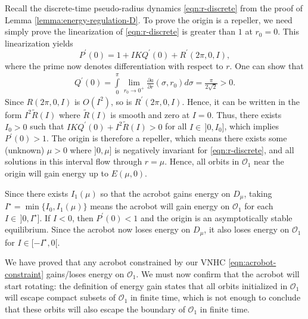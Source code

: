 \documentclass[journal,twoside,web, twocolumn,draftcls]{ieeecolor}
\newcommand*{\pdiff}[2]{\frac{\partial #1}{\partial #2}}
\begin{document}
Recall the discrete-time pseudo-radius dynamics \eqref{eqn:r-discrete} from the
proof of Lemma \ref{lemma:energy-regulation-D}. 
To prove the origin is a repeller, we need simply
prove the linearization of \eqref{eqn:r-discrete} is greater than \(1\) at 
\(r_0 = 0\). 
This linearization yields
\[
    P^\prime(0) = 1 + I K Q^\prime(0) + R^\prime(2\pi,0,I)
    ,
\]
where the prime now denotes differentiation with respect to \(r\).
One can show that
\begin{align*}
    Q^\prime(0) = \int \limits_0^\pi 
    \lim \limits_{r_0 \to 0^+}\pdiff{a}{r}(\sigma,r_0) d\sigma
    = \frac{\pi}{2\sqrt{2}} > 0
    .
\end{align*}
Since \(R(2\pi,0,I)\) is \(O(I^2)\), so is
\(R^\prime(2\pi,0,I)\).
Hence, it can be written in the form
\(I^2 \tilde{R}(I)\) where \(\tilde{R}(I)\) is smooth and zero at \(I = 0\).
Thus, there exists \(I_0 > 0\) such that 
\(I K Q^\prime(0) + I^2 \tilde{R}(I) > 0\) for all \(I \in \, ]0,I_0]\),
which implies \(P^\prime(0) > 1\).
The origin is therefore a repeller, which means there exists some
(unknown) \(\mu > 0\) where \(]0,\mu]\) is negatively
invariant for \eqref{eqn:r-discrete}, and all solutions in this
interval flow through \(r = \mu\).
Hence, all orbits in \(\mathcal{O}_1\) near the
origin will gain energy up to \(E(\mu,0)\).

Since there exists \(I_1(\mu)\) so that the acrobot gains energy on \(D_\mu\),
taking \(I^\star = \min\{I_0,I_1(\mu)\}\) means the acrobot will gain energy on
\(\mathcal{O}_1\) for each \(I \in \, ]0,I^\star]\).
If \(I < 0\), then \(P^\prime(0) < 1\) and the origin is an
asymptotically stable equilibrium.
Since the acrobot now loses energy on \(D_\mu\), it also loses energy 
on \(\mathcal{O}_1\) for \(I \in [-I^\star,0[\).

We have proved that any acrobot constrained by 
our VNHC \eqref{eqn:acrobot-constraint} gains/loses energy on \(\mathcal{O}_1\).
We must now confirm that the acrobot will start rotating:
the definition of energy gain states that all orbits initialized in
\(\mathcal{O}_1\) will escape compact subsets of \(\mathcal{O}_1\) in finite
time, which is not enough to conclude that these orbits will also escape the
boundary of \(\mathcal{O}_1\) in finite time.
\end{document}
